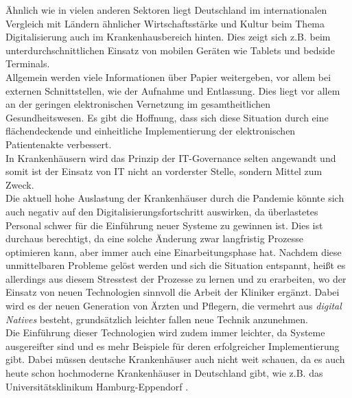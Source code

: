 Ähnlich wie in vielen anderen Sektoren liegt Deutschland im internationalen Vergleich mit Ländern ähnlicher Wirtschaftsstärke und Kultur beim Thema Digitalisierung auch im Krankenhausbereich hinten. Dies zeigt sich z.B. beim unterdurchschnittlichen Einsatz von mobilen Geräten wie Tablets und bedside Terminals.\\

Allgemein werden viele Informationen über Papier weitergeben, vor allem bei externen Schnittstellen, wie der Aufnahme und Entlassung. Dies liegt vor allem an der geringen elektronischen Vernetzung im gesamtheitlichen Gesundheitswesen. Es gibt die Hoffnung, dass sich diese Situation durch eine flächendeckende und einheitliche Implementierung der elektronischen Patientenakte verbessert.\\

In Krankenhäusern wird das Prinzip der IT-Governance selten angewandt und somit ist der Einsatz von IT nicht an vorderster Stelle, sondern Mittel zum Zweck.\\

Die aktuell hohe Auslastung der Krankenhäuser durch die Pandemie könnte sich auch negativ auf den Digitalisierungsfortschritt auswirken, da überlastetes Personal schwer für die Einführung neuer Systeme zu gewinnen ist. Dies ist durchaus berechtigt, da eine solche Änderung zwar langfristig Prozesse optimieren kann, aber immer auch eine Einarbeitungsphase hat. Nachdem diese unmittelbaren Probleme gelöst werden und sich die Situation entspannt, heißt es allerdings aus diesem Stresstest der Prozesse zu lernen und zu erarbeiten, wo der Einsatz von neuen Technologien sinnvoll die Arbeit der Kliniker ergänzt. Dabei wird es der neuen Generation von Ärzten und Pflegern, die vermehrt aus \textit{digital Natives} besteht, grundsätzlich leichter fallen neue Technik anzunehmen.\\

Die Einführung dieser Technologien wird zudem immer leichter, da Systeme ausgereifter sind und es mehr Beispiele für deren erfolgreicher Implementierung gibt. Dabei müssen deutsche Krankenhäuser auch nicht weit schauen, da es auch heute schon hochmoderne Krankenhäuser in Deutschland gibt, wie z.B. das Universitätsklinikum Hamburg-Eppendorf \parencite{Baehr2019}.
